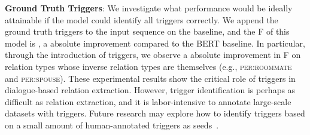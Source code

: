 \documentclass[11pt,a4paper]{article}
\newcommand{\eg}{{e.g.}}
\begin{document}
\noindent \textbf{Ground Truth Triggers}: We investigate what performance would be ideally attainable if the model could identify all triggers correctly. We append the ground truth triggers to the input sequence on the baseline, and the F of this model is , a  absolute improvement compared to the BERT baseline. In particular, through the introduction of triggers, we observe a  absolute improvement in F on relation types whose inverse relation types are themselves (\eg, \textsc{per:roommate} and \textsc{per:spouse}). These experimental results show the critical role of triggers in dialogue-based relation extraction. However, trigger identification is perhaps as difficult as relation extraction, and it is labor-intensive to annotate large-scale datasets with triggers. Future research may explore how to identify triggers based on a small amount of human-annotated triggers as seeds~\cite{bronstein2015seed,yu2016unsupervised}.
\end{document}
